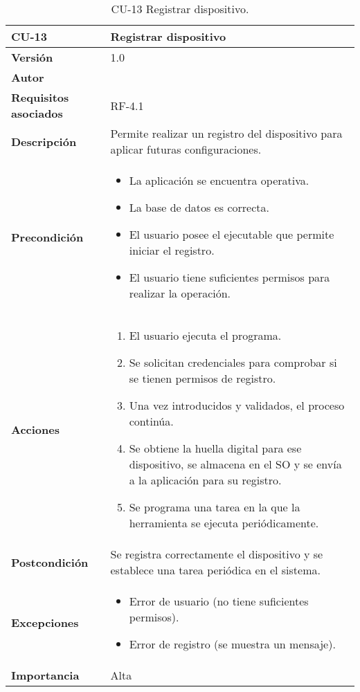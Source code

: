 \begin{table}[p]
	\centering
	\begin{tabularx}{\linewidth}{ p{} p{} }
		\toprule
		\textbf{CU-13}    & \textbf{ Registrar dispositivo}\\
		\toprule
		\textbf{Versión}              & 1.0    \\
		\textbf{Autor}                & \@author{} \\
		\textbf{Requisitos asociados} & RF-4.1\\
		\textbf{Descripción}          & Permite realizar un registro del dispositivo para aplicar futuras configuraciones. \\
		\textbf{Precondición}         &
		\begin{itemize}
			\tightlist
			\item La aplicación se encuentra operativa.
			\item La base de datos es correcta.
			\item El usuario posee el ejecutable que permite iniciar el registro.
			\item El usuario tiene suficientes permisos para realizar la operación.
		\end{itemize}\\
		\textbf{Acciones}             &
		\begin{enumerate}
			\tightlist
			\item El usuario ejecuta el programa.
			\item Se solicitan credenciales para comprobar si se tienen permisos de registro.
			\item Una vez introducidos y validados, el proceso continúa.
			\item Se obtiene la huella digital para ese dispositivo, se almacena en el SO y se envía a la aplicación para su registro.
			\item Se programa una tarea en la que la herramienta se ejecuta periódicamente.
		\end{enumerate}\\
		\textbf{Postcondición}        & Se registra correctamente el dispositivo y se establece una tarea periódica en el sistema.\\
		\textbf{Excepciones}          &
		\begin{itemize}
			\tightlist
			\item Error de usuario (no tiene suficientes permisos).
			\item Error de registro (se muestra un mensaje).
		\end{itemize}\\
		\textbf{Importancia}          & Alta\\
		\bottomrule
	\end{tabularx}
	\caption{CU-13 Registrar dispositivo.}\label{tab:table-13}
\end{table}


